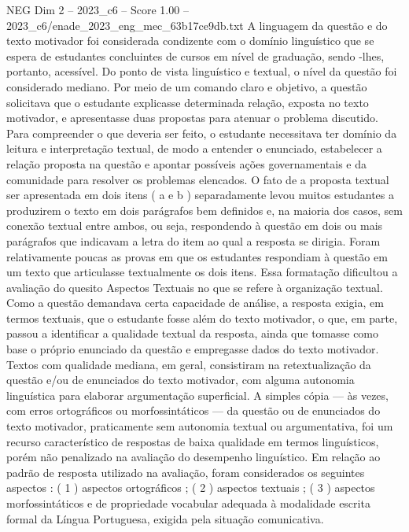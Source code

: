 \begin{textsample}{NEG Dim 2 – 2023\_c6 – Score 1.00 – 2023\_c6/enade\_2023\_eng\_mec\_63b17ce9db.txt}
A linguagem da questão e do texto motivador foi considerada condizente com o domínio linguístico que se espera de estudantes concluintes de cursos em nível de graduação, sendo -lhes, portanto, acessível.
Do ponto de vista linguístico e textual, o nível da questão foi considerado mediano.
Por meio de um comando claro e objetivo, a questão solicitava que o estudante explicasse determinada relação, exposta no texto motivador, e apresentasse duas propostas para atenuar o problema discutido.
Para compreender o que deveria ser feito, o estudante necessitava ter domínio da leitura e interpretação textual, de modo a entender o enunciado, estabelecer a relação proposta na questão e apontar possíveis ações governamentais e da comunidade para resolver os problemas elencados.
O fato de a proposta textual ser apresentada em dois itens ( a e b ) separadamente levou muitos estudantes a produzirem o texto em dois parágrafos bem definidos e, na maioria dos casos, sem conexão textual entre ambos, ou seja, respondendo à questão em dois ou mais parágrafos que indicavam a letra do item ao qual a resposta se dirigia.
Foram relativamente poucas as provas em que os estudantes respondiam à questão em um texto que articulasse textualmente os dois itens.
Essa formatação dificultou a avaliação do quesito Aspectos Textuais no que se refere à organização textual.
Como a questão demandava certa capacidade de análise, a resposta exigia, em termos textuais, que o estudante fosse além do texto motivador, o que, em parte, passou a identificar a qualidade textual da resposta, ainda que tomasse como base o próprio enunciado da questão e empregasse dados do texto motivador.
Textos com qualidade mediana, em geral, consistiram na retextualização da questão e/ou de enunciados do texto motivador, com alguma autonomia linguística para elaborar argumentação superficial.
A simples cópia — às vezes, com erros ortográficos ou morfossintáticos — da questão ou de enunciados do texto motivador, praticamente sem autonomia textual ou argumentativa, foi um recurso característico de respostas de baixa qualidade em termos linguísticos, porém não penalizado na avaliação do desempenho linguístico.
Em relação ao padrão de resposta utilizado na avaliação, foram considerados os seguintes aspectos : ( 1 ) aspectos ortográficos ; ( 2 ) aspectos textuais ; ( 3 ) aspectos morfossintáticos e de propriedade vocabular adequada à modalidade escrita formal da Língua Portuguesa, exigida pela situação comunicativa.

\end{textsample}

